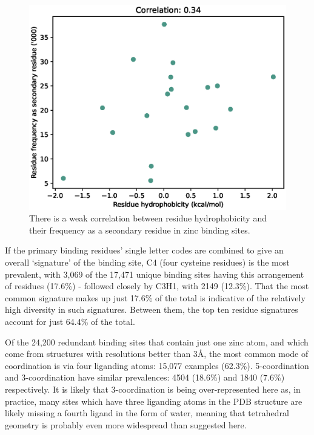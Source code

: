 \begin{figure}
\centering
\includegraphics[width=1.0\textwidth]{Figures/secondary-residues.eps}
\caption[Correlation between residue hydrophobicity and their frequency as a secondary residue in zinc binding sites]{\label{fig:secondary-residues.eps} There is a weak correlation between residue hydrophobicity and their frequency as a secondary residue in zinc binding sites.}
\end{figure}

If the primary binding residues' single letter codes are combined to give an overall `signature' of the binding site, C4 (four cysteine residues) is the most prevalent, with 3,069 of the 17,471 unique binding sites having this arrangement of residues (17.6\%) - followed closely by C3H1, with 2149 (12.3\%). That the most common signature makes up just 17.6\% of the total is indicative of the relatively high diversity in such signatures. Between them, the top ten residue signatures account for just 64.4\% of the total.

Of the 24,200 redundant binding sites that contain just one zinc atom, and which come from structures with resolutions better than 3\AA, the most common mode of coordination is via four liganding atoms: 15,077 examples (62.3\%). 5-coordination and 3-coordination have similar prevalences: 4504 (18.6\%) and 1840 (7.6\%) respectively. It is likely that 3-coordination is being over-represented here as, in practice, many sites which have three liganding atoms in the PDB structure are likely missing a fourth ligand in the form of water, meaning that tetrahedral geometry is probably even more widespread than suggested here.


